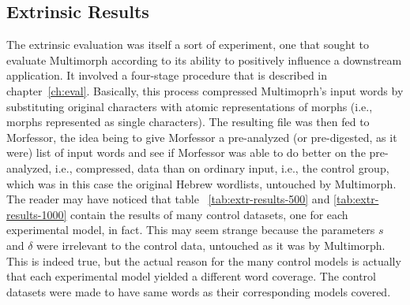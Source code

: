 {%

\subsection{Extrinsic Results}

The extrinsic evaluation was itself a sort of experiment, one that sought to evaluate Multimorph according to its 
ability to positively influence a downstream application. It involved a four-stage procedure that is described in 
chapter~\ref{ch:eval}. 
Basically, this process compressed Multimoprh's input words by substituting original characters with atomic 
representations of morphs (i.e., morphs represented as single characters). The resulting file was then fed to 
Morfessor, the idea being to give Morfessor a pre-analyzed (or pre-digested, as it were) list of input words and
 see if Morfessor was able to do better on the pre-analyzed, i.e., compressed, data than on ordinary input, i.e., 
 the control group, which was in this case the original Hebrew wordlists, untouched by Multimorph.
%
The reader may have noticed that table
~\ref{tab:extr-results-500} and \ref{tab:extr-results-1000} 
contain the 
	results of many control datasets, one for each experimental model, in fact. This may seem strange 
	because the parameters $s$ and $\delta$ were irrelevant to the control data, untouched as it was 
	by Multimorph. This is indeed true, but the actual reason for the many control models is actually 
	that each experimental model yielded a different word coverage. The control datasets were made 
	to have same words as their corresponding models covered. 

}
